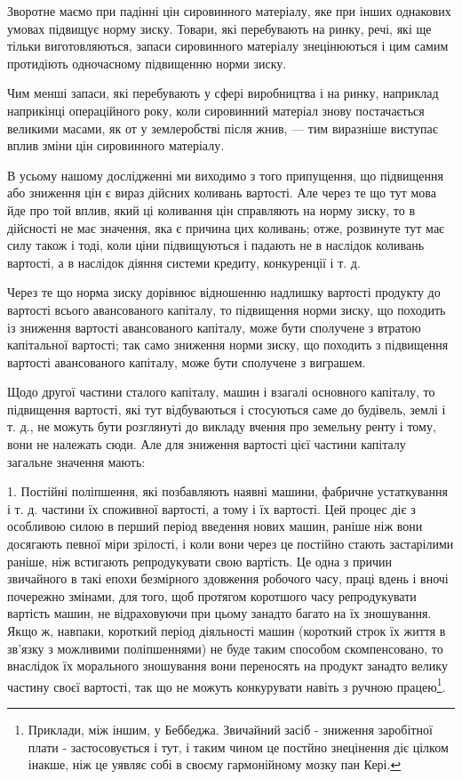 Зворотне маємо при падінні цін сировинного матеріалу, яке
при інших однакових умовах підвищує норму зиску. Товари, які
перебувають на ринку, речі, які ще тільки виготовляються,
запаси сировинного матеріалу знецінюються і цим самим протидіють
одночасному підвищенню норми зиску.

Чим менші запаси, які перебувають у сфері виробництва
і на ринку, наприклад наприкінці операційного року, коли сировинний
матеріал знову постачається великими масами, як от у землеробстві після жнив, — тим
виразніше виступає вплив зміни цін сировинного матеріалу.

В усьому нашому дослідженні ми виходимо з того припущення, що підвищення або зниження цін є вираз
дійсних коливань вартості. Але через те що тут мова йде про той вплив, який ці коливання цін
справляють на норму зиску, то в дійсності не має значення, яка є причина цих коливань; отже,
розвинуте тут має силу також і тоді, коли ціни підвищуються і падають не в наслідок коливань
вартості, а в наслідок діяння системи кредиту, конкуренції і т. д.

Через те що норма зиску дорівнює відношенню надлишку вартості продукту до вартості всього
авансованого капіталу, то підвищення норми зиску, що походить із зниження вартості авансованого
капіталу, може бути сполучене з втратою капітальної вартості; так само зниження норми зиску, що
походить з підвищення вартості авансованого капіталу, може бути сполучене з виграшем.

Щодо другої частини сталого капіталу, машин і взагалі основного капіталу, то підвищення вартості,
які тут відбуваються і стосуються саме до будівель, землі і т. д., не можуть бути розглянуті до
викладу вчення про земельну ренту і тому, вони не належать сюди. Але для зниження вартості цієї
частини капіталу загальне значення мають:

1. Постійні поліпшення, які позбавляють наявні машини, фабричне устаткування і т. д. частини їх
споживної вартості,
а тому і їх вартості. Цей процес діє з особливою силою в перший період введення нових машин, раніше
ніж вони досягають певної міри зрілості, і коли вони через це постійно стають застарілими раніше,
ніж встигають репродукувати свою вартість. Це одна з причин звичайного в такі епохи безмірного
здовження робочого часу, праці вдень і вночі почережно змінами, для того, щоб протягом коротшого
часу репродукувати вартість машин, не відраховуючи при цьому занадто багато на їх зношування. Якщо
ж, навпаки, короткий період діяльності
машин (короткий строк їх життя в зв’язку з можливими поліпшеннями) не буде таким способом
скомпенсовано, то внаслідок їх морального зношування вони переносять на продукт занадто велику
частину своєї вартості, так що не можуть конкурувати навіть з ручною працею\footnote{Приклади, між іншим,
у Беббеджа. Звичайний засіб - зниження заробітної плати - застосовується і тут, і таким чином це постйно
знецінення діє цілком інакше, ніж це уявляє собі в своєму гармонійному мозку пан Кері.
}.

